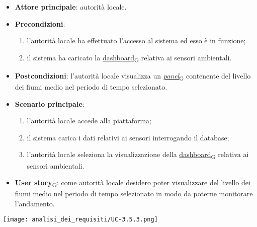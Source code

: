 \newpage
{}
\begin{itemize}
	\item \textbf{Attore principale}: autorità locale.
	\item \textbf{Precondizioni}:
	      \begin{enumerate}
		      \item l'autorità locale ha effettuato l'accesso al sistema ed esso è in funzione;
		      \item il sistema ha caricato la \href{https://7last.github.io/docs/pb/documentazione-interna/glossario\#dashboard}{dashboard\textsubscript{G}} relativa ai sensori ambientali.
	      \end{enumerate}
	\item \textbf{Postcondizioni}: l'autorità locale visualizza un \href{https://7last.github.io/docs/pb/documentazione-interna/glossario\#panel}{\textit{panel}\textsubscript{G}} contenente del livello dei fiumi medio nel periodo di tempo selezionato.
	\item \textbf{Scenario principale}:
	      \begin{enumerate}
		      \item l'autorità locale accede alla piattaforma;
		      \item il sistema carica i dati relativi ai sensori interrogando il database;
		      \item l'autorità locale seleziona la visualizzazione della \href{https://7last.github.io/docs/pb/documentazione-interna/glossario\#dashboard}{dashboard\textsubscript{G}} relativa ai sensori ambientali.
	      \end{enumerate}
	\item \href{https://7last.github.io/docs/pb/documentazione-interna/glossario\#user-story}{\textbf{User story}\textsubscript{G}}:
	      come autorità locale desidero poter visualizzare del livello dei fiumi medio nel periodo di tempo selezionato
	      in modo da poterne monitorare l'andamento.
\end{itemize}
\begin{center}
	\texttt{[image: analisi\_dei\_requisiti/UC-3.5.3.png]}
\end{center}


